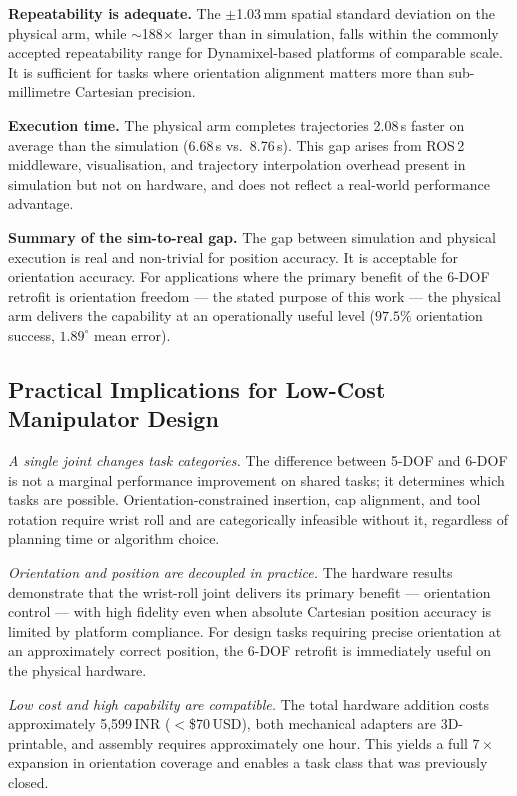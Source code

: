\documentclass[conference]{IEEEtran}
\begin{document}
	\textbf{Repeatability is adequate.}
	The $\pm$1.03\,mm spatial standard deviation on the physical
	arm, while $\sim$188$\times$ larger than in simulation, falls
	within the commonly accepted repeatability range for
	Dynamixel-based platforms of comparable scale. It is
	sufficient for tasks where orientation alignment matters more
	than sub-millimetre Cartesian precision.
	
	\textbf{Execution time.}
	The physical arm completes trajectories 2.08\,s faster on
	average than the simulation (6.68\,s vs.\ 8.76\,s). This gap
	arises from ROS\,2 middleware, visualisation, and trajectory
	interpolation overhead present in simulation but not on
	hardware, and does not reflect a real-world performance
	advantage.
	
	\textbf{Summary of the sim-to-real gap.}
	The gap between simulation and physical execution is real and
	non-trivial for position accuracy. It is acceptable for
	orientation accuracy. For applications where the primary
	benefit of the 6-DOF retrofit is orientation freedom —
	the stated purpose of this work — the physical arm delivers
	the capability at an operationally useful level ($97.5\%$
	orientation success, $1.89^\circ$ mean error).
	
	\subsection{Practical Implications for Low-Cost Manipulator
		Design}
	
	\textit{A single joint changes task categories.}
	The difference between 5-DOF and 6-DOF is not a marginal
	performance improvement on shared tasks; it determines which
	tasks are possible. Orientation-constrained insertion, cap
	alignment, and tool rotation require wrist roll and are
	categorically infeasible without it, regardless of planning
	time or algorithm choice.
	
	\textit{Orientation and position are decoupled in practice.}
	The hardware results demonstrate that the wrist-roll joint
	delivers its primary benefit — orientation control — with
	high fidelity even when absolute Cartesian position accuracy
	is limited by platform compliance. For design tasks requiring
	precise orientation at an approximately correct position, the
	6-DOF retrofit is immediately useful on the physical hardware.
	
	\textit{Low cost and high capability are compatible.}
	The total hardware addition costs approximately 5,599\,INR
	($<$\$70\,USD), both mechanical adapters are 3D-printable,
	and assembly requires approximately one hour. This yields a
	full $7\times$ expansion in orientation coverage and enables a
	task class that was previously closed.
	
\end{document}
